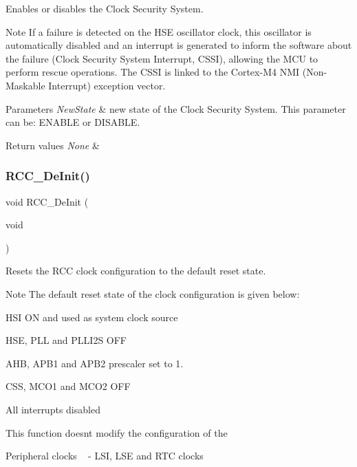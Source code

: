 Enables or disables the Clock Security System. 

\begin{DoxyNote}{Note}
If a failure is detected on the H\+SE oscillator clock, this oscillator is automatically disabled and an interrupt is generated to inform the software about the failure (Clock Security System Interrupt, C\+S\+SI), allowing the M\+CU to perform rescue operations. The C\+S\+SI is linked to the Cortex-\/\+M4 N\+MI (Non-\/\+Maskable Interrupt) exception vector. ~\newline

\end{DoxyNote}

\begin{DoxyParams}{Parameters}
{\em New\+State} & new state of the Clock Security System. This parameter can be\+: E\+N\+A\+B\+LE or D\+I\+S\+A\+B\+LE. \\
\hline
\end{DoxyParams}

\begin{DoxyRetVals}{Return values}
{\em None} & \\
\hline
\end{DoxyRetVals}
\mbox{\label{group___r_c_c_ga413f6422be11b1334abe60b3bff2e062}} 
\subsubsection{\texorpdfstring{R\+C\+C\+\_\+\+De\+Init()}{RCC\_DeInit()}}
{\footnotesize\ttfamily void R\+C\+C\+\_\+\+De\+Init (\begin{DoxyParamCaption}\item[{void}]{ }\end{DoxyParamCaption})}



Resets the R\+CC clock configuration to the default reset state. 

\begin{DoxyNote}{Note}
The default reset state of the clock configuration is given below\+:
\begin{DoxyItemize}
\item H\+SI ON and used as system clock source
\item H\+SE, P\+LL and P\+L\+L\+I2S O\+FF
\item A\+HB, A\+P\+B1 and A\+P\+B2 prescaler set to 1.
\item C\+SS, M\+C\+O1 and M\+C\+O2 O\+FF
\item All interrupts disabled 
\end{DoxyItemize}

This function doesn\textquotesingle{}t modify the configuration of the
\begin{DoxyItemize}
\item Peripheral clocks ~\newline
 -\/ L\+SI, L\+SE and R\+TC clocks 
\end{DoxyItemize}
\end{DoxyNote}

